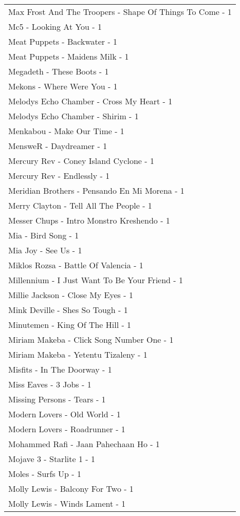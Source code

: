 \documentclass[
]{article}
\begin{document}
\begin{longtable}{l}
Max Frost And The Troopers - Shape Of Things To Come - 1 \\ 
Mc5 - Looking At You - 1 \\ 
Meat Puppets - Backwater - 1 \\ 
Meat Puppets - Maidens Milk - 1 \\ 
Megadeth - These Boots - 1 \\ 
Mekons - Where Were You - 1 \\ 
Melodys Echo Chamber - Cross My Heart - 1 \\ 
Melodys Echo Chamber - Shirim - 1 \\ 
Menkabou - Make Our Time - 1 \\ 
MensweR - Daydreamer - 1 \\ 
Mercury Rev - Coney Island Cyclone - 1 \\ 
Mercury Rev - Endlessly - 1 \\ 
Meridian Brothers - Pensando En Mi Morena - 1 \\ 
Merry Clayton - Tell All The People - 1 \\ 
Messer Chups - Intro Monstro Kreshendo - 1 \\ 
Mia - Bird Song - 1 \\ 
Mia Joy - See Us - 1 \\ 
Miklos Rozsa - Battle Of Valencia - 1 \\ 
Millennium - I Just Want To Be Your Friend - 1 \\ 
Millie Jackson - Close My Eyes - 1 \\ 
Mink Deville - Shes So Tough - 1 \\ 
Minutemen - King Of The Hill - 1 \\ 
Miriam Makeba - Click Song Number One - 1 \\ 
Miriam Makeba - Yetentu Tizaleny - 1 \\ 
Misfits - In The Doorway - 1 \\ 
Miss Eaves - 3 Jobs - 1 \\ 
Missing Persons - Tears - 1 \\ 
Modern Lovers - Old World - 1 \\ 
Modern Lovers - Roadrunner - 1 \\ 
Mohammed Rafi - Jaan Pahechaan Ho - 1 \\ 
Mojave 3 - Starlite 1 - 1 \\ 
Moles - Surfs Up - 1 \\ 
Molly Lewis - Balcony For Two - 1 \\ 
Molly Lewis - Winds Lament - 1 \\ 

\end{longtable}
\end{document}
